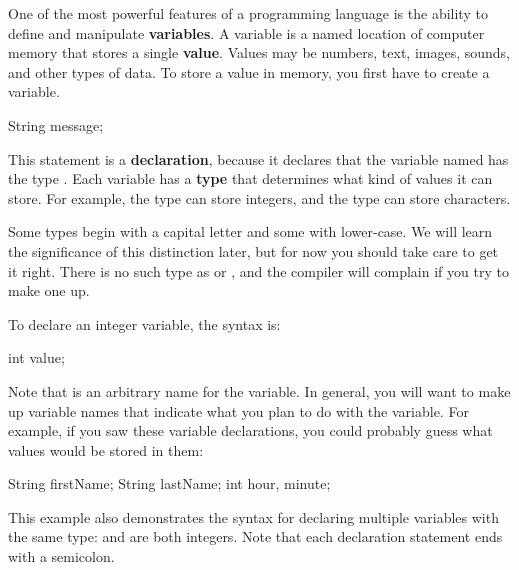 
One of the most powerful features of a programming language is the ability to define and manipulate {\bf variables}.
A variable is a named location of computer memory that stores a single {\bf value}.
Values may be numbers, text, images, sounds, and other types of data.
To store a value in memory, you first have to create a variable.

\begin{code}
    String message;
\end{code}


This statement is a {\bf declaration}, because it declares that the variable named  has the type .
Each variable has a {\bf type} that determines what kind of values it can store.
For example, the  type can store integers, and the  type can store characters.

Some types begin with a capital letter and some with lower-case.
We will learn the significance of this distinction later, but for now you should take care to get it right.
There is no such type as  or , and the compiler will complain if you try to make one up.

To declare an integer variable, the syntax is:

\begin{code}
    int value;
\end{code}

Note that  is an arbitrary name for the variable.
In general, you will want to make up variable names that indicate what you plan to do with the variable.
For example, if you saw these variable declarations, you could probably guess what values would be stored in them:

\begin{code}
    String firstName;
    String lastName;
    int hour, minute;
\end{code}

This example also demonstrates the syntax for declaring multiple variables with the same type:  and  are both integers.
Note that each declaration statement ends with a semicolon.

